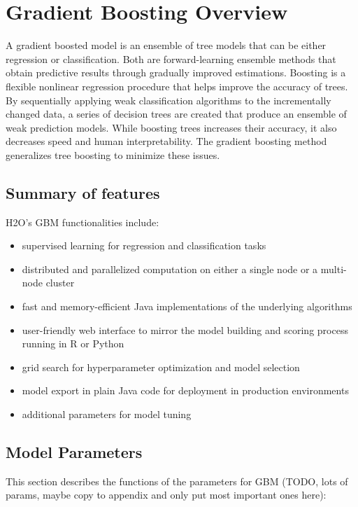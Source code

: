 \section{Gradient Boosting Overview}

A gradient boosted model is an ensemble of tree models that can be either regression or classification.
Both are forward-learning ensemble methods that obtain predictive results through gradually improved estimations.
Boosting is a flexible nonlinear regression procedure that helps improve the accuracy of trees.
By sequentially applying weak classification algorithms to the incrementally changed data,
a series of decision trees are created that produce an ensemble of weak prediction models.
While boosting trees increases their accuracy, it also decreases speed and human interpretability.
The gradient boosting method generalizes tree boosting to minimize these issues.

\subsection{Summary of features}
H2O's GBM functionalities include:

\begin{itemize}
\item supervised learning for regression and classification tasks
\item distributed and parallelized computation on either a single node or a multi-node cluster
\item fast and memory-efficient Java implementations of the underlying algorithms
\item user-friendly web interface to mirror the model building and scoring process running in R or Python
\item grid search for hyperparameter optimization and model selection
\item model export in plain Java code for deployment in production environments
\item additional parameters for model tuning
\end{itemize}

\subsection{ Model Parameters}

This section describes the functions of the parameters for GBM (TODO, lots of params, maybe copy to appendix and only put most important ones here):

